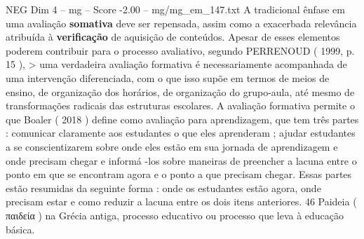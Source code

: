 \begin{textsample}{NEG Dim 4 – mg – Score -2.00 – mg/mg\_em\_147.txt}
A tradicional ênfase em uma avaliação \textbf{somativa} deve ser repensada, assim como a exacerbada relevância atribuída à \textbf{verificação} de aquisição de conteúdos.
Apesar de esses elementos poderem contribuir para o processo avaliativo, segundo PERRENOUD ( 1999, p. 15 ), > uma verdadeira avaliação formativa é necessariamente acompanhada de uma intervenção diferenciada, com o que isso supõe em termos de meios de ensino, de organização dos horários, de organização do grupo-aula, até mesmo de transformações radicais das estruturas escolares.
A avaliação formativa permite o que Boaler ( 2018 ) define como avaliação para aprendizagem, que tem três partes : comunicar claramente aos estudantes o que eles aprenderam ; ajudar estudantes a se conscientizarem sobre onde eles estão em sua jornada de aprendizagem e onde precisam chegar e informá -los sobre maneiras de preencher a lacuna entre o ponto em que se encontram agora e o ponto a que precisam chegar.
Essas partes estão resumidas da seguinte forma : onde os estudantes estão agora, onde precisam estar e como reduzir a lacuna entre os dois itens anteriores. 46 Paideia ( παιδεία ) na Grécia antiga, processo educativo ou processo que leva à educação básica.

\end{textsample}
